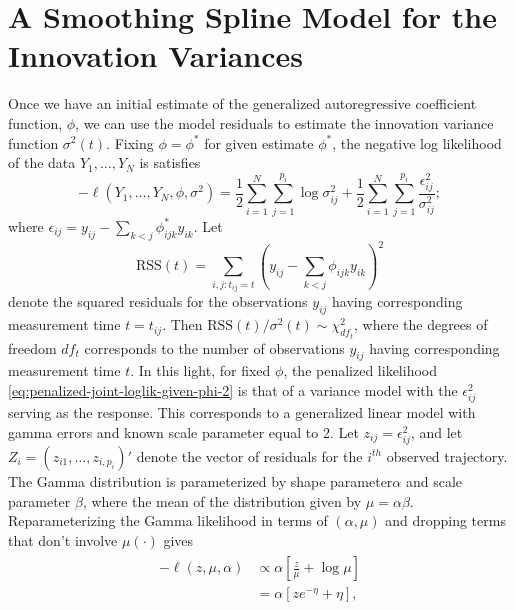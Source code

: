 \section{A Smoothing Spline Model for the Innovation Variances} \label{chapter-3-IV-modeling-section}
%

Once we have an initial estimate of the generalized autoregressive coefficient function, $\phi$, we can use the model residuals to estimate the innovation variance function $\sigma^2\left(t\right)$. Fixing $\phi = \phi^*$ for given estimate $\phi^*$, the negative log likelihood of the data $Y_1,\dots, Y_N$ is satisfies
\begin{equation} \label{eq:penalized-joint-loglik-given-phi-2}
-\ell\left( Y_1,\dots, Y_N, \phi, \sigma^2 \right) =  \frac{1}{2}\sum_{i = 1}^N \sum_{j = 1}^{p_i} \log \sigma^2_{ij}  + \frac{1}{2}\sum_{i = 1}^N \sum_{j = 1}^{p_i} \frac {\epsilon_{ij}^2}{\sigma^2_{ij}};
\end{equation}
\noindent
where $\epsilon_{ij} =  y_{ij} - \sum_{k<j} \phi^*_{ijk} y_{ik}$. Let 
\begin{equation}
\mbox{RSS}\left( t \right) = \sum_{i,j:t_{ij}= t} \left( y_{ij} - \sum_{k<j} \phi_{ijk} y_{ik}\right)^2
\end{equation}
\noindent
denote the squared residuals for the observations $y_{ij}$ having corresponding measurement time $t = t_{ij}$. Then $\mbox{RSS}\left( t \right)/\sigma^2\left(t\right) \sim \chi^2_{df_t}$, where the degrees of freedom $df_{t}$ corresponds to the number of observations $y_{ij}$ having corresponding measurement time $t$. In this light, for fixed $\phi$, the penalized likelihood \ref{eq:penalized-joint-loglik-given-phi-2} is that of a variance model with the $\epsilon_{ij}^2$ serving as the response.  This corresponds to a generalized linear model with gamma errors and known scale parameter equal to 2. Let $z_{ij} = \epsilon_{ij}^2$, and let $Z_{i} = \left(z_{i1},\dots, z_{i,p_i} \right)'$ denote the vector of residuals for the $i^{th}$ observed trajectory. The Gamma distribution is parameterized by shape parameter$\alpha$ and scale parameter $\beta$, where the mean of the distribution given by $\mu = \alpha \beta$. Reparameterizing the Gamma likelihood in terms of $\left(\alpha, \mu \right)$ and dropping terms that don't involve $\mu\left(\cdot\right)$ gives  
\begin{align}
\begin{split}
-\ell\left(z,\mu, \alpha \right) &\propto \alpha\left[\frac{z}{\mu} + \log \mu\right]  \\ 
&= \alpha\left[ze^{-\eta} + \eta\right],\label{eq:gamma-iv-likelihood-canonical-link}
\end{split}
\end{align}
